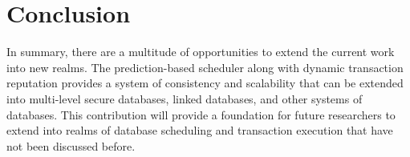 \section{Conclusion}
\label{mls:conclusion}
In summary, there are a multitude of opportunities to extend the current work into new realms. The prediction-based scheduler along with dynamic transaction reputation provides a system of consistency and scalability that can be extended into multi-level secure databases, linked databases, and other systems of databases. This contribution will provide a foundation for future researchers to extend into realms of database scheduling and transaction execution that have not been discussed before.
